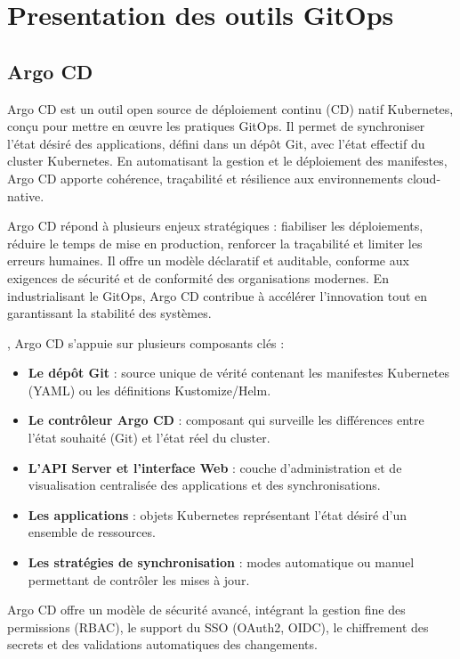 \section{Presentation des outils GitOps}
\subsection{Argo CD}

Argo CD est un outil open source de déploiement continu (CD) natif Kubernetes, conçu pour mettre en œuvre les pratiques GitOps. Il permet de synchroniser l’état désiré des applications, défini dans un dépôt Git, avec l’état effectif du cluster Kubernetes. En automatisant la gestion et le déploiement des manifestes, Argo CD apporte cohérence, traçabilité et résilience aux environnements cloud-native.

Argo CD répond à plusieurs enjeux stratégiques  : fiabiliser les déploiements, réduire le temps de mise en production, renforcer la traçabilité et limiter les erreurs humaines. Il offre un modèle déclaratif et auditable, conforme aux exigences de sécurité et de conformité des organisations modernes. En industrialisant le GitOps, Argo CD contribue à accélérer l’innovation tout en garantissant la stabilité des systèmes.

, Argo CD s’appuie sur plusieurs composants clés  :
\begin{itemize}
	\item \textbf{Le dépôt Git}  : source unique de vérité contenant les manifestes Kubernetes (YAML) ou les définitions Kustomize/Helm.
	\item \textbf{Le contrôleur Argo CD}  : composant qui surveille les différences entre l’état souhaité (Git) et l’état réel du cluster.
	\item \textbf{L’API Server et l’interface Web}  : couche d’administration et de visualisation centralisée des applications et des synchronisations.
	\item \textbf{Les applications}  : objets Kubernetes représentant l’état désiré d’un ensemble de ressources.
	\item \textbf{Les stratégies de synchronisation}  : modes automatique ou manuel permettant de contrôler les mises à jour.
\end{itemize}

Argo CD offre un modèle de sécurité avancé, intégrant la gestion fine des permissions (RBAC), le support du SSO (OAuth2, OIDC), le chiffrement des secrets et des validations automatiques des changements.

